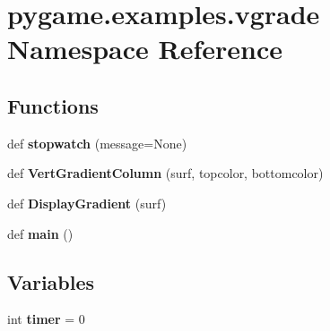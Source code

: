 \hypertarget{namespacepygame_1_1examples_1_1vgrade}{}\section{pygame.\+examples.\+vgrade Namespace Reference}
\label{namespacepygame_1_1examples_1_1vgrade}
\subsection*{Functions}
\begin{DoxyCompactItemize}
\item 
\mbox{\label{namespacepygame_1_1examples_1_1vgrade_aeade4e995f4ce754e380fbe3688d41f5}} 
def {\bfseries stopwatch} (message=None)
\item 
\mbox{\label{namespacepygame_1_1examples_1_1vgrade_a3ab68823cb6eca6b953c16ad3b43a104}} 
def {\bfseries Vert\+Gradient\+Column} (surf, topcolor, bottomcolor)
\item 
\mbox{\label{namespacepygame_1_1examples_1_1vgrade_a432fa8b74592b82a272af35971b267fc}} 
def {\bfseries Display\+Gradient} (surf)
\item 
\mbox{\label{namespacepygame_1_1examples_1_1vgrade_ae80020fdbdd5b3293c48c7585a7eed0a}} 
def {\bfseries main} ()
\end{DoxyCompactItemize}
\subsection*{Variables}
\begin{DoxyCompactItemize}
\item 
\mbox{\label{namespacepygame_1_1examples_1_1vgrade_a672f075a3c5819807e1ab7113824aa78}} 
int {\bfseries timer} = 0
\end{DoxyCompactItemize}


